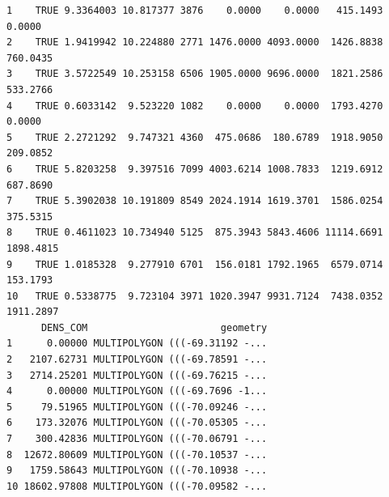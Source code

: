 \documentclass[
  letterpaper,
  DIV=11,
  numbers=noendperiod]{scrreprt}
\begin{document}
\begin{verbatim}
1    TRUE 9.3364003 10.817377 3876    0.0000    0.0000   415.1493    0.0000
2    TRUE 1.9419942 10.224880 2771 1476.0000 4093.0000  1426.8838  760.0435
3    TRUE 3.5722549 10.253158 6506 1905.0000 9696.0000  1821.2586  533.2766
4    TRUE 0.6033142  9.523220 1082    0.0000    0.0000  1793.4270    0.0000
5    TRUE 2.2721292  9.747321 4360  475.0686  180.6789  1918.9050  209.0852
6    TRUE 5.8203258  9.397516 7099 4003.6214 1008.7833  1219.6912  687.8690
7    TRUE 5.3902038 10.191809 8549 2024.1914 1619.3701  1586.0254  375.5315
8    TRUE 0.4611023 10.734940 5125  875.3943 5843.4606 11114.6691 1898.4815
9    TRUE 1.0185328  9.277910 6701  156.0181 1792.1965  6579.0714  153.1793
10   TRUE 0.5338775  9.723104 3971 1020.3947 9931.7124  7438.0352 1911.2897
      DENS_COM                       geometry
1      0.00000 MULTIPOLYGON (((-69.31192 -...
2   2107.62731 MULTIPOLYGON (((-69.78591 -...
3   2714.25201 MULTIPOLYGON (((-69.76215 -...
4      0.00000 MULTIPOLYGON (((-69.7696 -1...
5     79.51965 MULTIPOLYGON (((-70.09246 -...
6    173.32076 MULTIPOLYGON (((-70.05305 -...
7    300.42836 MULTIPOLYGON (((-70.06791 -...
8  12672.80609 MULTIPOLYGON (((-70.10537 -...
9   1759.58643 MULTIPOLYGON (((-70.10938 -...
10 18602.97808 MULTIPOLYGON (((-70.09582 -...
\end{verbatim}
\end{document}
